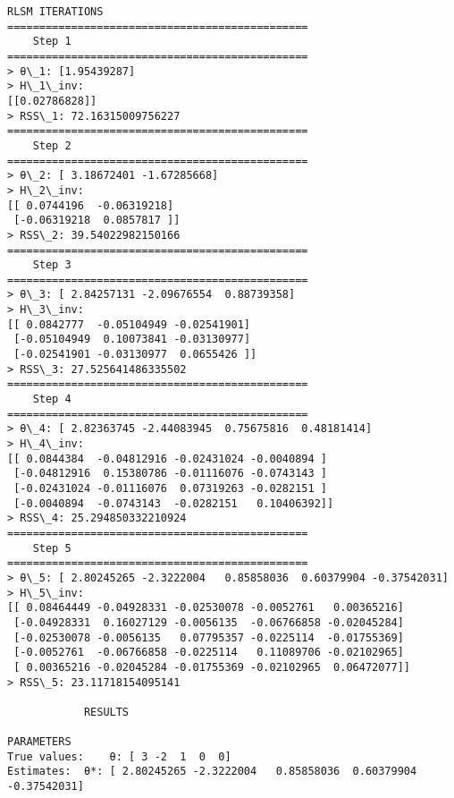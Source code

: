 \documentclass[11pt]{article}
\begin{document}
\begin{Verbatim}[commandchars=\\\{\}]
		RLSM ITERATIONS
===============================================
	Step 1
===============================================
> θ\_1: [1.95439287]
> H\_1\_inv:
[[0.02786828]]
> RSS\_1: 72.16315009756227
===============================================
	Step 2
===============================================
> θ\_2: [ 3.18672401 -1.67285668]
> H\_2\_inv:
[[ 0.0744196  -0.06319218]
 [-0.06319218  0.0857817 ]]
> RSS\_2: 39.54022982150166
===============================================
	Step 3
===============================================
> θ\_3: [ 2.84257131 -2.09676554  0.88739358]
> H\_3\_inv:
[[ 0.0842777  -0.05104949 -0.02541901]
 [-0.05104949  0.10073841 -0.03130977]
 [-0.02541901 -0.03130977  0.0655426 ]]
> RSS\_3: 27.525641486335502
===============================================
	Step 4
===============================================
> θ\_4: [ 2.82363745 -2.44083945  0.75675816  0.48181414]
> H\_4\_inv:
[[ 0.0844384  -0.04812916 -0.02431024 -0.0040894 ]
 [-0.04812916  0.15380786 -0.01116076 -0.0743143 ]
 [-0.02431024 -0.01116076  0.07319263 -0.0282151 ]
 [-0.0040894  -0.0743143  -0.0282151   0.10406392]]
> RSS\_4: 25.294850332210924
===============================================
	Step 5
===============================================
> θ\_5: [ 2.80245265 -2.3222004   0.85858036  0.60379904 -0.37542031]
> H\_5\_inv:
[[ 0.08464449 -0.04928331 -0.02530078 -0.0052761   0.00365216]
 [-0.04928331  0.16027129 -0.0056135  -0.06766858 -0.02045284]
 [-0.02530078 -0.0056135   0.07795357 -0.0225114  -0.01755369]
 [-0.0052761  -0.06766858 -0.0225114   0.11089706 -0.02102965]
 [ 0.00365216 -0.02045284 -0.01755369 -0.02102965  0.06472077]]
> RSS\_5: 23.11718154095141

			RESULTS

PARAMETERS
True values:	θ: [ 3 -2  1  0  0]
Estimates:	θ*: [ 2.80245265 -2.3222004   0.85858036  0.60379904 -0.37542031]

    \end{Verbatim}

    \begin{center}
    \end{center}
    { \hspace*{\fill} \\}
    
\end{document}
